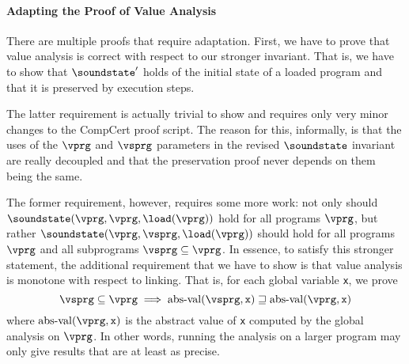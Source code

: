 
\paragraph{Adapting the Proof of Value Analysis}

There are multiple proofs that require adaptation.
First, we have to prove that value analysis is correct with respect to our stronger invariant.
That is, we have to show that $\soundstate'$ holds of the initial state of a loaded program and that it is preserved by execution steps.

The latter requirement is actually trivial to show and requires only
very minor changes to the CompCert proof script.  The reason for this,
informally, is that the uses of the $\vprg$ and $\vsprg$ parameters in
the revised $\soundstate$ invariant are really decoupled and that the
preservation proof never depends on them being the same.


The former requirement, however, requires some more work:
not only should $\soundstate(\vprg,\vprg,\load(\vprg))$ hold for all programs $\vprg$,
but rather $\soundstate(\vprg,\vsprg,\load(\vprg))$ should hold for all programs $\vprg$ and all subprograms $\vsprg\subseteq\vprg$.
In essence, to satisfy this stronger statement, the additional requirement that we have to show is that value analysis is monotone with respect to linking.
That is, for each global variable \texttt{x}, we prove
\[
\vsprg \subseteq \vprg \implies  \mathrm{abs\text{-}val}(\vsprg,\texttt{x}) \sqsupseteq \mathrm{abs\text{-}val}(\vprg,\texttt{x})
\]
where $\mathrm{abs\text{-}val}(\vprg,\texttt{x})$ is the abstract value of \texttt{x} computed by the global analysis on $\vprg$.
In other words, running the analysis on a larger program may only give results that are at least as precise.

